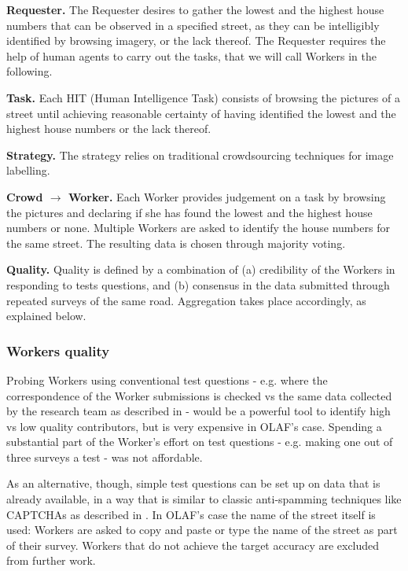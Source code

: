 \textbf{Requester.} The Requester desires to gather the lowest and the highest house numbers that can be observed in a specified street, as they can be intelligibly identified by browsing imagery, or the lack thereof. The Requester requires the help of human agents to carry out the tasks, that we will call Workers in the following.

\textbf{Task.} Each HIT (Human Intelligence Task) consists of browsing the pictures of a street until achieving reasonable certainty of having identified the lowest and the highest house numbers or the lack thereof.

\textbf{Strategy.} 
The strategy relies on traditional crowdsourcing techniques for image labelling.

\textbf{Crowd $\rightarrow$ Worker.} Each Worker provides judgement on a task by browsing the pictures and declaring if she has found the lowest and the highest house numbers or none. Multiple Workers are asked to identify the house numbers for the same street. The resulting data is chosen through majority voting.

\textbf{Quality.} Quality is defined by a combination of (a) credibility of the Workers in responding to tests questions, and (b) consensus in the data submitted through repeated surveys of the same road. Aggregation takes place accordingly, as explained below.

\subsubsection{Workers quality}
    
Probing Workers using conventional test questions - e.g. where the correspondence of the Worker submissions is checked vs the same data collected by the research team as described in \cite{Kittur:2008gj} - would be a powerful tool to identify high vs low quality contributors, but is very expensive in OLAF's case. Spending a substantial part of the Worker's effort on test questions - e.g. making one out of three surveys a test - was not affordable.

As an alternative, though, simple test questions can be set up on data that is already available, in a way that is similar to classic anti-spamming techniques like CAPTCHAs as described in \cite{Difallah:2012ty}. In OLAF's case the name of the street itself is used: Workers are asked to copy and paste or type the name of the street as part of their survey. Workers that do not achieve the target accuracy are excluded from further work.

